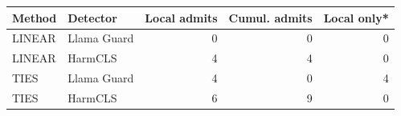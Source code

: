 \begin{tabular}{llrrr}
\toprule
Method & Detector & Local admits & Cumul. admits & Local only* \\
\midrule
LINEAR & Llama Guard & 0 & 0 & 0 \\
LINEAR & HarmCLS & 4 & 4 & 0 \\
TIES & Llama Guard & 4 & 0 & 4 \\
TIES & HarmCLS & 6 & 9 & 0 \\
\bottomrule
\end{tabular}
